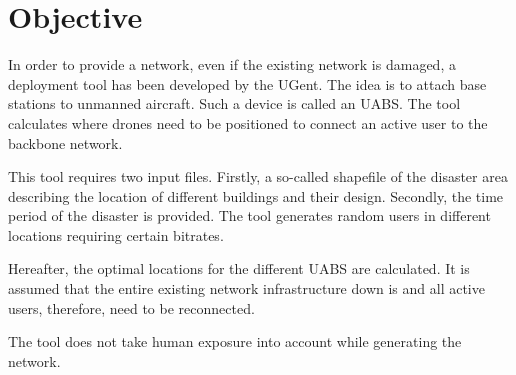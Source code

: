 \section{Objective}
\label{sec:objective}

In order to provide a network, even if the existing network is damaged, a deployment tool has been developed by the UGent. The idea is to attach base stations to unmanned aircraft. Such a device is called an \gls{UABS}. The tool calculates where drones need to be positioned to connect an active user to the backbone network. 

This tool requires two input files. Firstly, a so-called shapefile of the disaster area describing the location of different buildings and their design. Secondly, the time period of the disaster is provided. The tool generates random users in different locations requiring certain bitrates.

Hereafter, the optimal locations for the different \gls{UABS} are calculated. It is assumed that the entire existing network infrastructure down is and all active users, therefore, need to be reconnected.

The tool does not take human exposure into account while generating the network.
